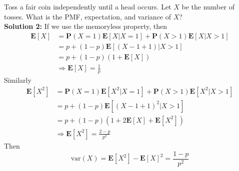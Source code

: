 \documentclass[device=normal, lang=en, fontsize=12pt]{elegantnote}
\numberwithin{equation}{section}
\theoremstyle{definition} %
\begin{document}
\begin{example}
    Toss a fair coin independently until a head occurs. Let $X$ be the number of tosses. What is the PMF, expectation, and variance of $X$? \\ 
    \textbf{Solution 2:} If we use the memoryless property, then 
    \begin{equation}
    \begin{aligned}
        \mathbf{E}[X] &= \mathbf{P}(X = 1)\mathbf{E}[X | X = 1] + \mathbf{P}(X > 1)\mathbf{E}[X | X > 1] \\ 
        &= p + (1-p)\mathbf{E}[(X - 1 + 1) | X > 1] \\
        &= p + (1-p)(1 + \mathbf{E}[X]) \\ 
        &\Rightarrow \mathbf{E}[X] = \frac{1}{p}
    \end{aligned}
    \end{equation}
    Similarly
    \begin{equation}
    \begin{aligned}
        \mathbf{E}[X^2] &= \mathbf{P}(X = 1)\mathbf{E}[X^2 | X = 1] + \mathbf{P}(X > 1)\mathbf{E}[X^2 | X > 1] \\
        &= p + (1-p)\mathbf{E}[(X - 1 + 1)^2 | X > 1] \\
        &= p + (1-p)(1 + 2\mathbf{E}[X] + \mathbf{E}[X^2]) \\
        &\Rightarrow \mathbf{E}[X^2] = \frac{2-p}{p^2}
    \end{aligned}
    \end{equation}
    Then
    \begin{equation}
        \text{var}(X) = \mathbf{E}[X^2] - \mathbf{E}[X]^2 = \frac{1-p}{p^2}
    \end{equation}
\end{example}
\end{document}
